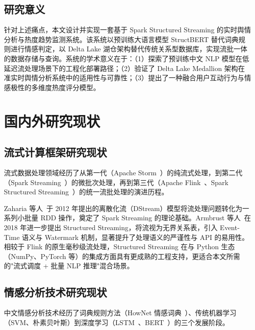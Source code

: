 \subsection{研究意义}

针对上述痛点，本文设计并实现一套基于 Spark Structured Streaming 的实时舆情分析与热度趋势监测系统。该系统以预训练大语言模型 StructBERT 替代词典规则进行情感判定，以 Delta Lake 湖仓架构替代传统关系型数据库，实现流批一体的数据存储与查询。系统的学术意义在于：（1）探索了预训练中文 NLP 模型在低延迟流处理场景下的工程化部署路径；（2）验证了 Delta Lake Medallion 架构在准实时舆情分析系统中的适用性与可靠性；（3）提出了一种融合用户互动行为与情感极性的多维度热度评分模型。

\section{国内外研究现状}

\subsection{流式计算框架研究现状}

流式数据处理领域经历了从第一代（Apache Storm~\cite{storm2014}）的纯流式处理，到第二代（Spark Streaming~\cite{zaharia2012discretized}）的微批次处理，再到第三代（Apache Flink~\cite{carbone2015apache}、Spark Structured Streaming~\cite{armbrust2018structured}）的统一流批处理的演进历程。

Zaharia 等人~\cite{zaharia2012discretized}于 2012 年提出的离散化流（DStream）模型将流处理问题转化为一系列小批量 RDD 操作，奠定了 Spark Streaming 的理论基础。Armbrust 等人~\cite{armbrust2018structured}在 2018 年进一步提出 Structured Streaming，将流视为无界关系表，引入 Event-Time 语义与 Watermark 机制，显著提升了处理语义的严谨性与 API 的易用性。相较于 Flink 的原生毫秒级流处理，Structured Streaming 在与 Python 生态（NumPy、PyTorch 等）的集成方面具有更成熟的工程支持，更适合本文所需的"流式调度 + 批量 NLP 推理"混合场景。

\subsection{情感分析技术研究现状}

中文情感分析技术经历了词典规则方法（HowNet 情感词典~\cite{dong2003hownet}）、传统机器学习（SVM、朴素贝叶斯）到深度学习（LSTM~\cite{hochreiter1997lstm}、BERT~\cite{devlin2019bert}）的三个发展阶段。

